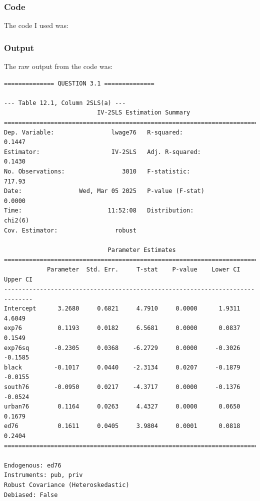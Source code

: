 \documentclass[10pt]{article}
\begin{document}
\subsubsection*{Code}\label{code}

The code I used was:




\subsubsection*{Output}\label{output}

The raw output from the code was:
\begin{verbatim}
============== QUESTION 3.1 ==============

--- Table 12.1, Column 2SLS(a) ---
                          IV-2SLS Estimation Summary                          
==============================================================================
Dep. Variable:                lwage76   R-squared:                      0.1447
Estimator:                    IV-2SLS   Adj. R-squared:                 0.1430
No. Observations:                3010   F-statistic:                    717.93
Date:                Wed, Mar 05 2025   P-value (F-stat)                0.0000
Time:                        11:52:08   Distribution:                  chi2(6)
Cov. Estimator:                robust                                         
                                                                              
                             Parameter Estimates                              
==============================================================================
            Parameter  Std. Err.     T-stat    P-value    Lower CI    Upper CI
------------------------------------------------------------------------------
Intercept      3.2680     0.6821     4.7910     0.0000      1.9311      4.6049
exp76          0.1193     0.0182     6.5681     0.0000      0.0837      0.1549
exp76sq       -0.2305     0.0368    -6.2729     0.0000     -0.3026     -0.1585
black         -0.1017     0.0440    -2.3134     0.0207     -0.1879     -0.0155
south76       -0.0950     0.0217    -4.3717     0.0000     -0.1376     -0.0524
urban76        0.1164     0.0263     4.4327     0.0000      0.0650      0.1679
ed76           0.1611     0.0405     3.9804     0.0001      0.0818      0.2404
==============================================================================

Endogenous: ed76
Instruments: pub, priv
Robust Covariance (Heteroskedastic)
Debiased: False


\end{verbatim}
\end{document}
